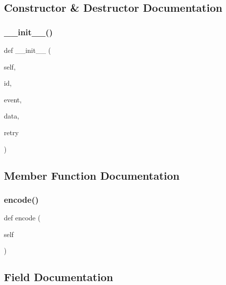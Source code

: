 \subsection{Constructor \& Destructor Documentation}
\hypertarget{classweb_back_1_1_server_sent_event_a66ce128aaaf6596bbc7b0e6f3168de3f}{}\label{classweb_back_1_1_server_sent_event_a66ce128aaaf6596bbc7b0e6f3168de3f} 
\subsubsection{\texorpdfstring{\+\_\+\+\_\+init\+\_\+\+\_\+()}{\_\_init\_\_()}}
{\footnotesize\ttfamily def \+\_\+\+\_\+init\+\_\+\+\_\+ (\begin{DoxyParamCaption}\item[{}]{self,  }\item[{}]{id,  }\item[{}]{event,  }\item[{}]{data,  }\item[{}]{retry }\end{DoxyParamCaption})}



\subsection{Member Function Documentation}
\hypertarget{classweb_back_1_1_server_sent_event_a4b60b01b4d79989f97d040a26388d852}{}\label{classweb_back_1_1_server_sent_event_a4b60b01b4d79989f97d040a26388d852} 
\subsubsection{\texorpdfstring{encode()}{encode()}}
{\footnotesize\ttfamily def encode (\begin{DoxyParamCaption}\item[{}]{self }\end{DoxyParamCaption})}



\subsection{Field Documentation}
\hypertarget{classweb_back_1_1_server_sent_event_a511ae0b1c13f95e5f08f1a0dd3da3d93}{}\label{classweb_back_1_1_server_sent_event_a511ae0b1c13f95e5f08f1a0dd3da3d93} 
